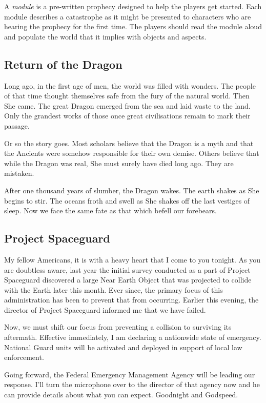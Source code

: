 \documentclass[12pt, a5paper, parskip=half-]{scrartcl}
\begin{document}
A \emph{module} is a pre-written prophecy designed to help the players get started.
Each module describes a catastrophe as it might be presented to characters who are hearing the prophecy for the first time.  The players should read the module aloud and populate the world that it implies with objects and aspects.

\subsection*{Return of the Dragon} \label{subsection:return-of-the-dragon}
Long ago, in the first age of men, the world was filled with wonders. 
The people of that time thought themselves safe from the fury of the natural world.
Then She came.
The great Dragon emerged from the sea and laid waste to the land.
Only the grandest works of those once great civilisations remain to mark their passage.

Or so the story goes.
Most scholars believe that the Dragon is a myth and that the Ancients were somehow responsible for their own demise.
Others believe that while the Dragon was real, She must surely have died long ago.
They are mistaken. 

After one thousand years of slumber, the Dragon wakes. 
The earth shakes as She begins to stir.
The oceans froth and swell as She shakes off the last vestiges of sleep.
Now we face the same fate as that which befell our forebears.

\newpage

\subsection*{Project Spaceguard} \label{subsection:project-spaceguard}
My fellow Americans, it is with a heavy heart that I come to you tonight. 
As you are doubtless aware, last year the initial survey conducted as a part of Project Spaceguard discovered a large Near Earth Object that was projected to collide with the Earth later this month.
Ever since, the primary focus of this administration has been to prevent that from occurring. Earlier this evening, the director of Project Spaceguard informed me that we have failed.

Now, we must shift our focus from preventing a collision to surviving its aftermath.
Effective immediately, I am declaring a nationwide state of emergency. 
National Guard units will be activated and deployed in support of local law enforcement. 

Going forward, the Federal Emergency Management Agency will be leading our response.
I'll turn the microphone over to the director of that agency now and he can provide details about what you can expect.
Goodnight and Godspeed.
\end{document}
